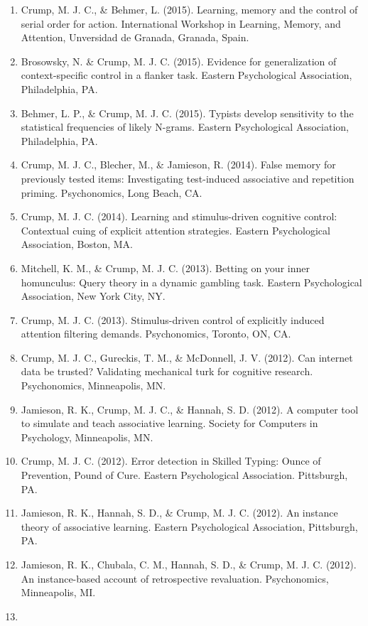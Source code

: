 \documentclass[11pt,a4paper,]{moderncv}
\begin{document}
\begin{enumerate}
\item
  Crump, M. J. C., \& Behmer, L. (2015). Learning, memory and the control of serial order for action. International Workshop in Learning, Memory, and Attention, Unversidad de Granada, Granada, Spain.
\item
  Brosowsky, N. \& Crump, M. J. C. (2015). Evidence for generalization of context-specific control in a flanker task. Eastern Psychological Association, Philadelphia, PA.
\item
  Behmer, L. P., \& Crump, M. J. C. (2015). Typists develop sensitivity to the statistical frequencies of likely N-grams. Eastern Psychological Association, Philadelphia, PA.
\item
  Crump, M. J. C., Blecher, M., \& Jamieson, R. (2014). False memory for previously tested items: Investigating test-induced associative and repetition priming. Psychonomics, Long Beach, CA.
\item
  Crump, M. J. C. (2014). Learning and stimulus-driven cognitive control: Contextual cuing of explicit attention strategies. Eastern Psychological Association, Boston, MA.
\item
  Mitchell, K. M., \& Crump, M. J. C. (2013). Betting on your inner homunculus: Query theory in a dynamic gambling task. Eastern Psychological Association, New York City, NY.
\item
  Crump, M. J. C. (2013). Stimulus-driven control of explicitly induced attention filtering demands. Psychonomics, Toronto, ON, CA.
\item
  Crump, M. J. C., Gureckis, T. M., \& McDonnell, J. V. (2012). Can internet data be trusted? Validating mechanical turk for cognitive research. Psychonomics, Minneapolis, MN.
\item
  Jamieson, R. K., Crump, M. J. C., \& Hannah, S. D. (2012). A computer tool to simulate and teach associative learning. Society for Computers in Psychology, Minneapolis, MN.
\item
  Crump, M. J. C. (2012). Error detection in Skilled Typing: Ounce of Prevention, Pound of Cure. Eastern Psychological Association. Pittsburgh, PA.
\item
  Jamieson, R. K., Hannah, S. D., \& Crump, M. J. C. (2012). An instance theory of associative learning. Eastern Psychological Association, Pittsburgh, PA.
\item
  Jamieson, R. K., Chubala, C. M., Hannah, S. D., \& Crump, M. J. C. (2012). An instance-based account of retrospective revaluation. Psychonomics, Minneapolis, MI.
\item

\end{enumerate}
\end{document}
